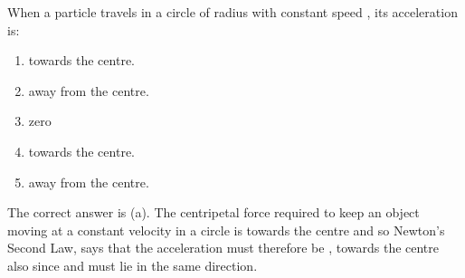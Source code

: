 \begin{problem}[AO1989PIQ10l] 
{When a particle travels in a circle of radius  with constant speed , its acceleration is:
\begin{enumerate}
	\item {} towards the centre. \answer
	\item {} away from the centre.
	\item zero
	\item {} towards the centre.
	\item {} away from the centre.
\end{enumerate}
}
{}
{The correct answer is (a). The centripetal force required to keep an object moving at a constant velocity in a circle is  towards the centre and so Newton's Second Law,  says that the acceleration must therefore be , towards the centre also since  and  must lie in the same direction.}
\end{problem}